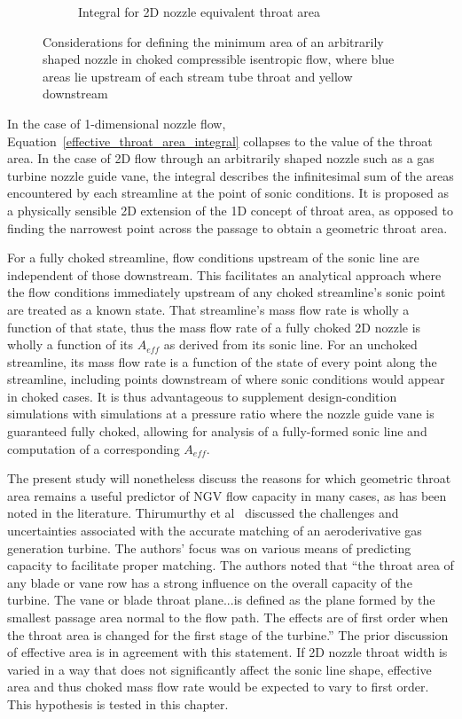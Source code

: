 \documentclass[a4paper, 11pt, oneside]{report}
\begin{document}
\begin{figure}[H]
\begin{subfigure}{.45\textwidth}
		\caption{Integral for 2D nozzle equivalent throat area \hfill \break}
		\label{fig:illustration_of_equivalent_throat_area_integral}
	\end{subfigure}
	\caption{Considerations for defining the minimum area of an arbitrarily shaped nozzle in choked compressible isentropic flow, where blue areas lie upstream of each stream tube throat and yellow downstream}
\end{figure}

In the case of 1-dimensional nozzle flow, Equation~\ref{effective_throat_area_integral} collapses to the value of the throat area. In the case of 2D flow through an arbitrarily shaped nozzle such as a gas turbine nozzle guide vane, the integral describes the infinitesimal sum of the areas encountered by each streamline at the point of sonic conditions. It is proposed as a physically sensible 2D extension of the 1D concept of throat area, as opposed to finding the narrowest point across the passage to obtain a geometric throat area. 

For a fully choked streamline, flow conditions upstream of the sonic line are independent of those downstream. This facilitates an analytical approach where the flow conditions immediately upstream of any choked streamline's sonic point are treated as a known state. That streamline's mass flow rate is wholly a function of that state, thus the mass flow rate of a fully choked 2D nozzle is wholly a function of its $A_{eff}$ as derived from its sonic line. For an unchoked streamline, its mass flow rate is a function of the state of every point along the streamline, including points downstream of where sonic conditions would appear in choked cases. It is thus advantageous to supplement design-condition simulations with simulations at a pressure ratio where the nozzle guide vane is guaranteed fully choked, allowing for analysis of a fully-formed sonic line and computation of a corresponding $A_{eff}$.

The present study will nonetheless discuss the reasons for which geometric throat area remains a useful predictor of NGV flow capacity in many cases, as has been noted in the literature. Thirumurthy et al~\cite{thirumurthy_throat_area} discussed the challenges and uncertainties associated with the accurate matching of an aeroderivative gas generation turbine. The authors' focus was on various means of predicting capacity to facilitate proper matching. The authors noted that ``the throat area of any blade or vane row has a strong influence on the overall capacity of the turbine. The vane or blade throat plane...is defined as the plane formed by the smallest passage area normal to the flow path. The effects are of first order when the throat area is changed for the first stage of the turbine.'' The prior discussion of effective area is in agreement with this statement. If 2D nozzle throat width is varied in a way that does not significantly affect the sonic line shape, effective area and thus choked mass flow rate would be expected to vary to first order. This hypothesis is tested in this chapter.
\end{document}
